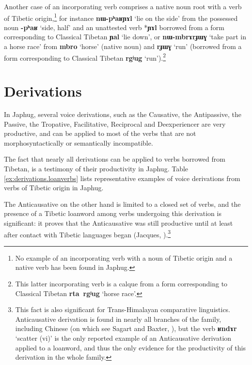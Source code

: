 \documentclass[oneside,a4paper,11pt]{article}
\newcommand{\ipa}[1]{{\phon\textbf{\mbox{#1}}}} %
\begin{document}
Another case of an incorporating verb comprises a native noun root with a verb of Tibetic origin,\footnote{No example of an incorporating verb with a noun of Tibetic origin and a native verb has been found in Japhug.} for instance  \ipa{nɯ-pʰaʁɲɤl} `lie on the side' from the possessed noun \ipa{-pʰaʁ} `side, half' and an unattested verb *\ipa{ɲɤl} borrowed from a form corresponding to Classical Tibetan \ipa{ɲal} `lie down', or \ipa{nɯ-mbrɤrɟɯɣ} `take part in a horse race' from \ipa{mbro} `horse' (native noun) and \ipa{rɟɯɣ} `run' (borrowed from a form corresponding to Classical Tibetan \ipa{rgʲug} `run').\footnote{This latter incorporating verb is a calque from a form corresponding to Classical Tibetan \ipa{rta rgʲug} `horse race'.}
  
\section{Derivations}
In Japhug, several voice derivations, such as the Causative, the Antipassive, the Passive, the Tropative, Facilitative, Reciprocal and Deexperiencer are very productive, and can be applied to most of the verbs that are not morphosyntactically or semantically incompatible. 


The fact that nearly all derivations can be applied to verbs borrowed from Tibetan, is a testimony of their productivity in Japhug. Table \ref{ex:derivations.loanverbs} lists representative examples of voice derivations from verbs of Tibetic origin in Japhug.

The Anticausative on the other hand is limited to a closed set of verbs, and the presence of a Tibetic loanword among verbs undergoing this derivation is significant: it proves that the Anticausative was still productive until at least after contact with Tibetic languages began (Jacques, \citeyear{jacques12demotion}).\footnote{This fact is also significant for Trans-Himalayan comparative linguistics. Anticausative derivation is found in nearly all branches of the family, including Chinese (on which see Sagart and Baxter, \citeyear{sagart12sprefix}), but the verb \ipa{ʁndɤr} `scatter (vi)' is the only reported example of an Anticausative derivation applied to a loanword, and thus the only evidence for the productivity of this derivation in the whole family. }
\end{document}

